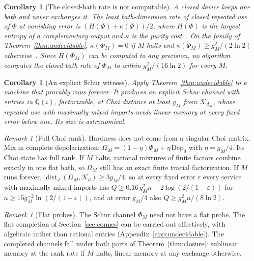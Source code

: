 \documentclass[11pt]{article}
\newtheorem{corollary}[lemma]{Corollary}
\theoremstyle{definition}
\theoremstyle{remark}
\newtheorem{remark}[lemma]{Remark}
\DeclareMathOperator{\dist}{dist}
\newcommand{\K}{\mathcal K}
\newcommand{\eps}{\varepsilon}
\begin{document}
\begin{corollary}[The closed-bath rate is not computable]\label{cor:closed}
A closed device keeps one bath and never exchanges it. The least bath-dimension rate of closed repeated use of $\Phi$ at vanishing error is $(H(\Phi)+\kappa(\Phi))/2$, where $H(\Phi)$ is the largest entropy of a complementary output and $\kappa$ is the purity cost~\cite[Theorem~2.1]{ClosedMemory}. On the family of Theorem~\ref{thm:undecidable}, $\kappa(\Phi_M)=0$ if $M$ halts and $\kappa(\Phi_M)\ge g_M^2/(2\ln2)$ otherwise~\cite[Theorem~3.2(a)]{Memory}. Since $H(\Phi_M)$ can be computed to any precision, no algorithm computes the closed-bath rate of $\Phi_M$ to within $g_M^2/(16\ln2)$ for every $M$.
\end{corollary}

\begin{corollary}[An explicit Schur witness]\label{cor:explicit-schur}
Apply Theorem~\ref{thm:undecidable} to a machine that provably runs forever. It produces an explicit Schur channel with entries in $\mathbb Q(i)$, factorizable, at Choi distance at least $g_M$ from $\K_{d_M}$, whose repeated use with maximally mixed imports needs linear memory at every fixed error below one. Its size is astronomical.
\end{corollary}

\begin{remark}[Full Choi rank]\label{rem:full-rank}
Hardness does not come from a singular Choi matrix. Mix in complete depolarization: $\Omega_M=(1-\eta)\Phi_M+\eta\,\mathrm{Dep}_d$ with $\eta=g_M/4$. Its Choi state has full rank. If $M$ halts, rational mixtures of finite factors combine exactly in one flat bath, so $\Omega_M$ still has an exact finite tracial factorization. If $M$ runs forever, $\dist_J(\Omega_M,\K_d)\ge3g_M/4$, so at every fixed error $\eps$ every service with maximally mixed imports has $Q\ge0.16\,g_M^2n-2\log(2/(1-\eps))$ for $n\ge15g_M^{-2}\ln(2/(1-\eps))$, and at error $g_M/4$ also $Q\ge g_M^2n/(8\ln2)$.
\end{remark}

\begin{remark}[Flat probes]\label{rem:flat-undecidable}
The Schur channel $\Phi_M$ need not have a flat probe. The flat completion of Section~\ref{sec:connes} can be carried out effectively, with algebraic rather than rational entries (Appendix~\ref{app:undecidable}). The completed channels fall under both parts of Theorem~\ref{thm:closure}: sublinear memory at the rank rate if $M$ halts, linear memory at any exchange otherwise.
\end{remark}
\end{document}
